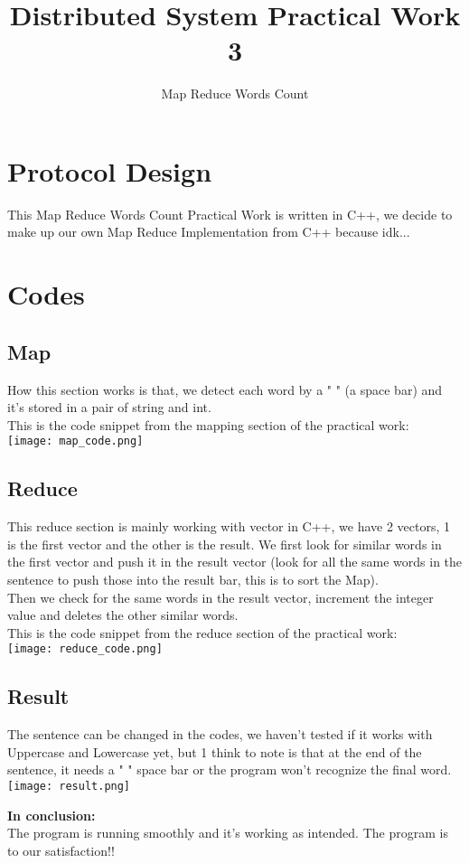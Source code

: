 \documentclass[12pt]{article}
\title{Distributed System Practical Work 3}
\author{Map Reduce Words Count}
\begin{document}
\maketitle

\tableofcontents
\pagebreak

\section{Protocol Design}
This Map Reduce Words Count Practical Work is written in C++, we decide to make up our own Map Reduce Implementation from C++ because idk...\\

\section{Codes}
\subsection{Map}
How this section works is that, we detect each word by a " " (a space bar) and it's stored in a pair of string and int.\\
This is the code snippet from the mapping section of the practical work: \\
\texttt{[image: map\_code.png]}

\subsection{Reduce}
This reduce section is mainly working with vector in C++, we have 2 vectors, 1 is the first vector and the other is the result. We first look for similar words in the first vector and push it in the result vector (look for all the same words in the sentence to push those into the result bar, this is to sort the Map). \\
Then we check for the same words in the result vector, increment the integer value and deletes the other similar words. \\
This is the code snippet from the reduce section of the practical work: \\
\texttt{[image: reduce\_code.png]}

\subsection{Result}
The sentence can be changed in the codes, we haven't tested if it works with Uppercase and Lowercase yet, but 1 think to note is that at the end of the sentence, it needs a " " space bar or the program won't recognize the final word.\\
\texttt{[image: result.png]}

\textbf{In conclusion:}\\
The program is running smoothly and it's working as intended. The program is to our satisfaction!!
\end{document}
